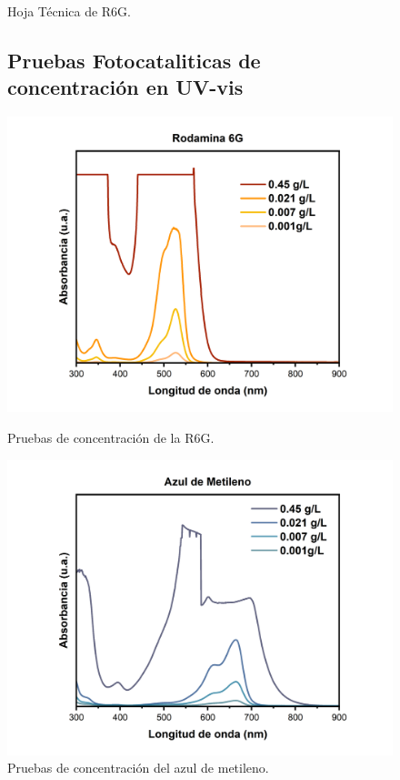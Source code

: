 \documentclass[12pt]{article}
\begin{document}
\begin{figure}[htbp]
\begin{minipage}{0.4\textwidth}
    \caption{Hoja Técnica de R6G.}
    \label{fig:Manual_UV}
   \end{minipage}
\end{figure}

\begin{figure}[htbp]
\subsection*{Pruebas Fotocataliticas de concentración en UV-vis}
  \begin{minipage}{0.5\textwidth}
    \centering
    \includegraphics[width=\linewidth]{Imagenes/R6G/R6G_Concentracion.png}
    \caption{Pruebas de concentración de la R6G.}
    \label{fig:imagen1}
  \end{minipage}\hfill
  \begin{minipage}{0.5\textwidth}
    \centering
    \includegraphics[width=\linewidth]{Imagenes/MB/AzulDeMetileno_Concentracion.png}
    \caption{Pruebas de concentración del azul de metileno.}
    \label{fig:imagen2}
  \end{minipage}
\end{figure}
\end{document}
